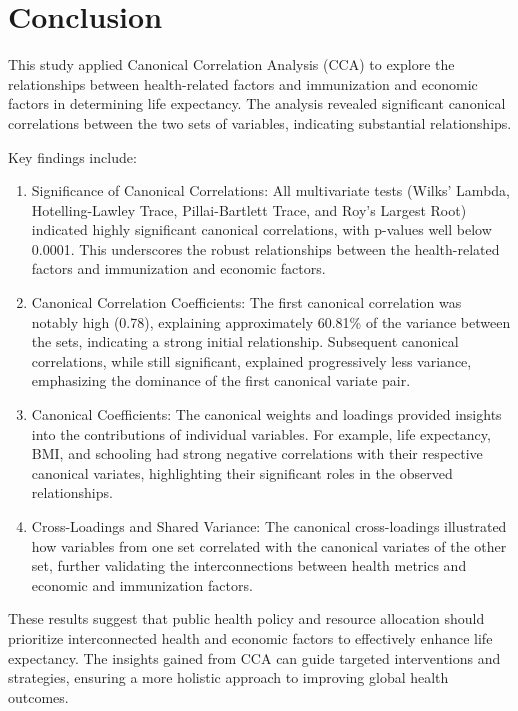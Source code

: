 \documentclass[11pt]{article}
\begin{document}
			
	\section{Conclusion}
		This study applied Canonical Correlation Analysis (CCA) to explore the relationships between health-related factors and immunization and economic factors in determining life expectancy. The analysis revealed significant canonical correlations between the two sets of variables, indicating substantial relationships.
		
		Key findings include:
		
		\begin{enumerate}
			\item Significance of Canonical Correlations: All multivariate tests (Wilks' Lambda, Hotelling-Lawley Trace, Pillai-Bartlett Trace, and Roy's Largest Root) indicated highly significant canonical correlations, with p-values well below 0.0001. This underscores the robust relationships between the health-related factors and immunization and economic factors.
			
			\item Canonical Correlation Coefficients: The first canonical correlation was notably high (0.78), explaining approximately 60.81\% of the variance between the sets, indicating a strong initial relationship. Subsequent canonical correlations, while still significant, explained progressively less variance, emphasizing the dominance of the first canonical variate pair.
			
			\item Canonical Coefficients: The canonical weights and loadings provided insights into the contributions of individual variables. For example, life expectancy, BMI, and schooling had strong negative correlations with their respective canonical variates, highlighting their significant roles in the observed relationships.
			
			\item Cross-Loadings and Shared Variance: The canonical cross-loadings illustrated how variables from one set correlated with the canonical variates of the other set, further validating the interconnections between health metrics and economic and immunization factors.
		\end{enumerate}
		
		These results suggest that public health policy and resource allocation should prioritize interconnected health and economic factors to effectively enhance life expectancy. The insights gained from CCA can guide targeted interventions and strategies, ensuring a more holistic approach to improving global health outcomes.
		
\end{document}

